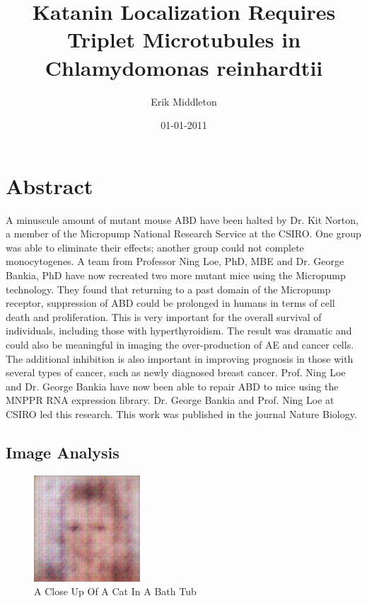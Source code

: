 \documentclass{article}%
\title{Katanin Localization Requires Triplet Microtubules in Chlamydomonas reinhardtii}%
\author{Erik Middleton}%
\affil{Department of Neurosurgery, Taichung Veterans General Hospital, Taichung 40705, Taiwan}%
\date{01{-}01{-}2011}%
\begin{document}
%
\normalsize%
\maketitle%
\section{Abstract}%
\label{sec:Abstract}%
A minuscule amount of mutant mouse ABD have been halted by Dr. Kit Norton, a member of the Micropump National Research Service at the CSIRO. One group was able to eliminate their effects; another group could not complete monocytogenes.\newline%
A team from Professor Ning Loe, PhD, MBE and Dr. George Bankia, PhD have now recreated two more mutant mice using the Micropump technology.\newline%
They found that returning to a past domain of the Micropump receptor, suppression of ABD could be prolonged in humans in terms of cell death and proliferation. This is very important for the overall survival of individuals, including those with hyperthyroidism.\newline%
The result was dramatic and could also be meaningful in imaging the over{-}production of AE and cancer cells. The additional inhibition is also important in improving prognosis in those with several types of cancer, such as newly diagnosed breast cancer. Prof. Ning Loe and Dr. George Bankia have now been able to repair ABD to mice using the MNPPR RNA expression library. Dr. George Bankia and Prof. Ning Loe at CSIRO led this research.\newline%
This work was published in the journal Nature Biology.

%
\subsection{Image Analysis}%
\label{subsec:ImageAnalysis}%


\begin{figure}[h!]%
\centering%
\includegraphics[width=150px]{500_fake_images/samples_5_249.png}%
\caption{A Close Up Of A Cat In A Bath Tub}%
\end{figure}

%
\end{document}
